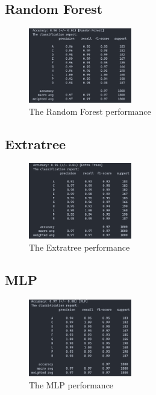 \documentclass[11pt,en]{elegantpaper}
\begin{document}
\subsection*{Random Forest}
\begin{figure}[H]
	\centering
	\includegraphics[width=0.4\textwidth]{image/rfpf}
	\caption{The Random Forest performance}
	\label{rfpf}
\end{figure}

\subsection*{Extratree}
\begin{figure}[H]
	\centering
	\includegraphics[width=0.4\textwidth]{image/etpf}
	\caption{The Extratree performance}
	\label{etpf}
\end{figure}


\subsection*{MLP}
\begin{figure}[H]
	\centering
	\includegraphics[width=0.4\textwidth]{image/mlppf}
	\caption{The MLP performance}
	\label{mlppf}
\end{figure}
\end{document}
